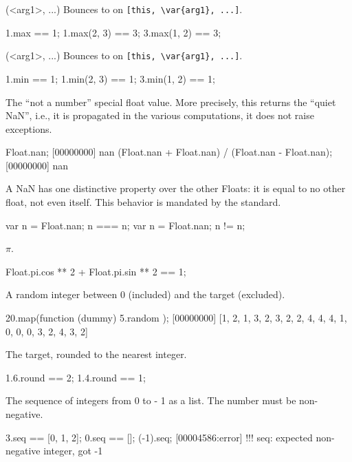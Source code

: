 \begin{urbiscriptapi}
\item[max](<arg1>, ...)%
  Bounces to  on \lstinline|[this, \var{arg1}, ...]|.
\begin{urbiassert}
1.max == 1;
1.max(2, 3) == 3;
3.max(1, 2) == 3;
\end{urbiassert}

\item[min](<arg1>, ...)%
  Bounces to  on \lstinline|[this, \var{arg1}, ...]|.
\begin{urbiassert}
1.min == 1;
1.min(2, 3) == 1;
3.min(1, 2) == 1;
\end{urbiassert}

\item[nan]
  The ``not a number'' special float value.  More precisely, this
  returns the ``quiet NaN'', i.e., it is propagated in the various
  computations, it does not raise exceptions.
\begin{urbiscript}
Float.nan;
[00000000] nan
(Float.nan + Float.nan) / (Float.nan - Float.nan);
[00000000] nan
\end{urbiscript}

A {NaN} has one distinctive property over the other Floats: it is
equal to no other float, not even itself.  This behavior is mandated
by the  standard.
\begin{urbiassert}
{ var n = Float.nan; n === n};
{ var n = Float.nan; n  != n};
\end{urbiassert}

\item[pi]
  $\pi$.
\begin{urbiassert}
Float.pi.cos ** 2 + Float.pi.sin ** 2 == 1;
\end{urbiassert}

\item[random]
  A random integer between 0 (included) and the target (excluded).
\begin{urbiscript}
20.map(function (dummy) { 5.random });
[00000000] [1, 2, 1, 3, 2, 3, 2, 2, 4, 4, 4, 1, 0, 0, 0, 3, 2, 4, 3, 2]
\end{urbiscript}

\item[round]
  The target, rounded to the nearest integer.
\begin{urbiassert}
1.6.round == 2;
1.4.round == 1;
\end{urbiassert}

\item[seq]
  The sequence of integers from 0 to \this - 1 as a list.
  The number must be non-negative.
\begin{urbiassert}
3.seq == [0, 1, 2];
0.seq == [];
(-1).seq;
[00004586:error] !!! seq: expected non-negative integer, got -1
\end{urbiassert}


\end{urbiscriptapi}

